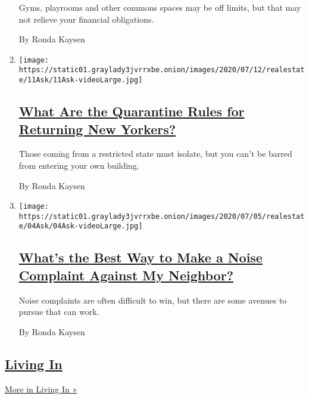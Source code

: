 \begin{enumerate}
  Gyms, playrooms and other commons spaces may be off limits, but that
  may not relieve your financial obligations.

  By Ronda Kaysen
\item
  \texttt{[image: https://static01.graylady3jvrrxbe.onion/images/2020/07/12/realestate/11Ask/11Ask-videoLarge.jpg]}

  \hypertarget{what-are-the-quarantine-rules-for-returning-new-yorkers}{%
  \subsection{\texorpdfstring{\href{/2020/07/11/realestate/what-are-the-quarantine-rules-for-returning-new-yorkers-coronavirus.html}{What
  Are the Quarantine Rules for Returning New
  Yorkers?}}{What Are the Quarantine Rules for Returning New Yorkers?}}\label{what-are-the-quarantine-rules-for-returning-new-yorkers}}

  Those coming from a restricted state must isolate, but you can't be
  barred from entering your own building.

  By Ronda Kaysen
\item
  \texttt{[image: https://static01.graylady3jvrrxbe.onion/images/2020/07/05/realestate/04Ask/04Ask-videoLarge.jpg]}

  \hypertarget{whats-the-best-way-to-make-a-noise-complaint-against-my-neighbor}{%
  \subsection{\texorpdfstring{\href{/2020/07/04/realestate/whats-the-best-way-to-make-a-noise-complaint-against-my-neighbor.html}{What's
  the Best Way to Make a Noise Complaint Against My
  Neighbor?}}{What's the Best Way to Make a Noise Complaint Against My Neighbor?}}\label{whats-the-best-way-to-make-a-noise-complaint-against-my-neighbor}}

  Noise complaints are often difficult to win, but there are some
  avenues to pursue that can work.

  By Ronda Kaysen
\end{enumerate}

\hypertarget{living-in-1}{%
\subsection{\texorpdfstring{\href{/column/living-in}{Living
In}}{Living In}}\label{living-in-1}}

\href{/column/living-in}{More in Living In »}

